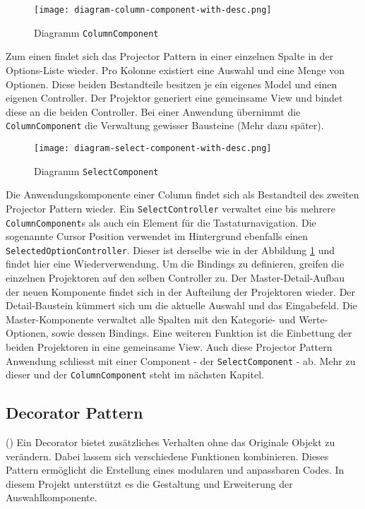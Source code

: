 \begin{figure}[!htb]
    \centering
    \texttt{[image: diagram-column-component-with-desc.png]}
    \caption{Diagramm \texttt{ColumnComponent}}
    \label{img:diagramColumnComponent}
\end{figure}

Zum einen findet sich das Projector Pattern in einer einzelnen Spalte in der Options-Liste wieder.
Pro Kolonne existiert eine Auswahl und eine Menge von Optionen.
Diese beiden Bestandteile besitzen je ein eigenes Model und einen eigenen Controller.
Der Projektor generiert eine gemeinsame View und bindet diese an die beiden Controller.
Bei einer Anwendung übernimmt die \texttt{ColumnComponent} die Verwaltung gewisser Bausteine (Mehr dazu später).

\begin{figure}[!htb]
    \centering
    \texttt{[image: diagram-select-component-with-desc.png]}
    \caption{Diagramm \texttt{SelectComponent}}
    \label{img:diagramSelectComponent}
\end{figure}

Die Anwendungskomponente einer Column findet sich als Bestandteil des zweiten Projector Pattern wieder.
Ein \texttt{SelectController} verwaltet eine bis mehrere \texttt{ColumnComponent}s als auch ein Element für die Tastaturnavigation.
Die sogenannte Cursor Position verwendet im Hintergrund ebenfalls einen \texttt{SelectedOptionController}. 
Dieser ist derselbe wie in der Abbildung \ref{img:diagramColumnComponent} und findet hier eine Wiederverwendung.
Um die Bindings zu definieren, greifen die einzelnen Projektoren auf den selben Controller zu.
Der Master-Detail-Aufbau der neuen Komponente findet sich in der Aufteilung der Projektoren wieder.
Der Detail-Baustein kümmert sich um die aktuelle Auswahl und das Eingabefeld.
Die Master-Komponente verwaltet alle Spalten mit den Kategorie- und Werte-Optionen, sowie dessen Bindings.
Eine weiteren Funktion ist die Einbettung der beiden Projektoren in eine gemeinsame View.
Auch diese Projector Pattern Anwendung schliesst mit einer Component - der \texttt{SelectComponent} - ab.
Mehr zu dieser und der \texttt{ColumnComponent} steht im nächsten Kapitel.


\subsection{Decorator Pattern}
\label{sec:decoratorPattern}

(\cite{decoratorPattern}) Ein Decorator bietet zusätzliches Verhalten ohne das Originale Objekt zu verändern.
Dabei lassem sich verschiedene Funktionen kombinieren.
Dieses Pattern ermöglicht die Erstellung eines modularen und anpassbaren Codes.
In diesem Projekt unterstützt es die Gestaltung und Erweiterung der Auswahlkomponente.

